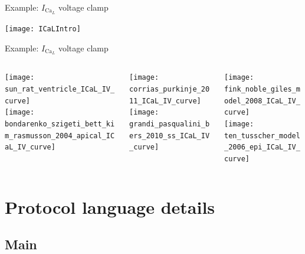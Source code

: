 \documentclass[t,xcolor={usenames,dvipsnames}]{beamer}
\begin{document}
\begin{frame}{Example: $I_{\textrm{Ca}_L}$ voltage clamp}
\begin{center}
\texttt{[image: ICaLIntro]}
\end{center}
\end{frame}

\begin{frame}{Example: $I_{\textrm{Ca}_L}$ voltage clamp}
\begin{columns}[T]
\begin{column}{.33\linewidth}
\begin{center}
\texttt{[image: sun\_rat\_ventricle\_ICaL\_IV\_curve]}\\
\vspace{.1cm}
\texttt{[image: bondarenko\_szigeti\_bett\_kim\_rasmusson\_2004\_apical\_ICaL\_IV\_curve]}
\end{center}
\end{column}
\begin{column}{.33\linewidth}
\begin{center}
\texttt{[image: corrias\_purkinje\_2011\_ICaL\_IV\_curve]}\\
\vspace{.1cm}
\texttt{[image: grandi\_pasqualini\_bers\_2010\_ss\_ICaL\_IV\_curve]}
\end{center}
\end{column}
\begin{column}{.33\linewidth}
\begin{center}
\texttt{[image: fink\_noble\_giles\_model\_2008\_ICaL\_IV\_curve]}\\
\vspace{.1cm}
\texttt{[image: ten\_tusscher\_model\_2006\_epi\_ICaL\_IV\_curve]}
\end{center}
\end{column}
\end{columns}
\end{frame}

\section{Protocol language details}
\subsection*{Main}
\end{document}
